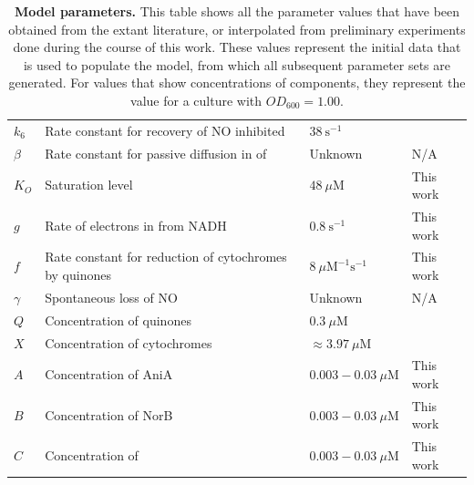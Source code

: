 \begin{table}[tbp]
\begin{center}
\begin{tabular}{>{\centering}m{1.6cm}>{\centering}m{6.1cm}>{\centering}m{2.5cm}>{\centering}m{3.1cm}}
$k_6$ & Rate constant for recovery of NO inhibited \cbbthree{} & $38~\mathrm{s}^{-1}$ & \citet{Rock2005}
\tabularnewline\noalign{\smallskip}\hline\noalign{\smallskip}

$\beta$ & Rate constant for passive diffusion in of \cOxygen{} & Unknown & N/A
\tabularnewline\noalign{\smallskip}\hline\noalign{\smallskip}

$K_O$ & Saturation \cOxygen{} level & $48~\mu \mathrm{M}$ & This work
\tabularnewline\noalign{\smallskip}\hline\noalign{\smallskip}

$g$ & Rate of electrons in from NADH & $0.8~\mathrm{s}^{-1}$ & This work
\tabularnewline\noalign{\smallskip}\hline\noalign{\smallskip}

$f$ & Rate constant for reduction of cytochromes by quinones & $8~\mu \mathrm{M}^{-1}\mathrm{s}^{-1}$ & This work
\tabularnewline\noalign{\smallskip}\hline\noalign{\smallskip}

$\gamma$ & Spontaneous loss of NO & Unknown & N/A
\tabularnewline\noalign{\smallskip}\hline\noalign{\smallskip}

$Q$ & Concentration of quinones & $0.3~\mu \mathrm{M}$ & \citet{Hedrick1986}
\tabularnewline\noalign{\smallskip}\hline\noalign{\smallskip}

$X$ & Concentration of cytochromes & $\approx3.97~\mu \mathrm{M}$ & \citet{Deeudom2007}
\tabularnewline\noalign{\smallskip}\hline\noalign{\smallskip}

$A$ & Concentration of AniA & $0.003 - 0.03~\mu \mathrm{M}$ & This work
\tabularnewline\noalign{\smallskip}\hline\noalign{\smallskip}

$B$ & Concentration of NorB & $0.003 - 0.03~\mu \mathrm{M}$ & This work
\tabularnewline\noalign{\smallskip}\hline\noalign{\smallskip}

$C$ & Concentration of \cbbthree{} & $0.003 - 0.03~\mu \mathrm{M}$ & This work
\tabularnewline
\bottomrule
\end{tabular}
\caption[Model parameters]{{\bf Model parameters.} This table shows all the parameter values that have been obtained from the extant literature, or interpolated from preliminary experiments done during the course of this work. These values represent the initial data that is used to populate the model, from which all subsequent parameter sets are generated. For values that show concentrations of components, they represent the value for a culture with $OD_{600}=1.00$.
\label{tab:ps}}
\end{center}
\end{table}

